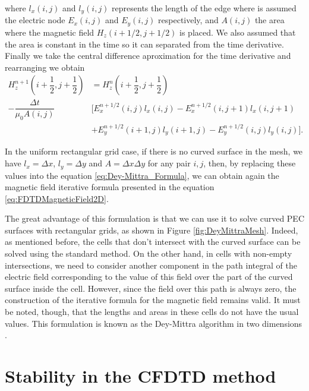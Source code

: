 \documentclass[12pt, oneside]{book}
\begin{document}
where $l_x(i,j)$ and $l_y(i,j)$ represents the length of the edge where is assumed the electric node $E_x(i,j)$ and $E_y(i,j)$ respectively, and $A(i,j)$ the area where the magnetic field $H_z (i + 1/2, j + 1/2)$ is placed. We also assumed that the area is constant in the time so it can separated from the time derivative. Finally we take the central difference aproximation for the time derivative and rearranging we obtain
\begin{equation}
    \begin{aligned}
        H_z^{n + 1}\left( i + \dfrac{1}{2}, j + \dfrac{1}{2} \right) &= H_z^{n}\left( i + \dfrac{1}{2}, j + \dfrac{1}{2} \right)  \\
        - \dfrac{\Delta t}{\mu_0 A(i,j)} & \big[ E^{n + 1/2}_x(i,j) l_x(i,j)- E^{n + 1/2}_x(i,j+1) l_x(i,j+1)  \\
                                                                       &+  E^{n + 1/2}_y(i+1,j) l_y(i+1,j) - E^{n + 1/2}_y(i,j) l_y(i,j)\big].  
    \end{aligned}
\label{eq:Dey-Mittra_Formula}
\end{equation}

In the uniform rectangular grid case, if there is no curved surface in the mesh, we have $l_x = \Delta x$, $l_y = \Delta y$ and $A = \Delta x \Delta y$ for any pair $i,j$, then, by replacing these values into the equation \ref{eq:Dey-Mittra_Formula}, we can obtain again the magnetic field iterative formula presented in the equation \ref{eq:FDTDMagneticField2D}.

The great advantage of this formulation is that we can use it to solve curved PEC surfaces with rectangular grids, as shown in Figure \ref{fig:DeyMittraMesh}. Indeed, as mentioned before, the cells that don't intersect with the curved surface can be solved using the standard method. On the other hand, in cells with non-empty intersections, we need to consider another component in the path integral of the electric field corresponding to the value of this field over the part of the curved surface inside the cell. However, since the field over this path is always zero, the construction of the iterative formula for the magnetic field remains valid. It must be noted, though, that the lengths and areas in these cells do not have the usual values. This formulation is known as the Dey-Mittra algorithm in two dimensions \cite{DeyMittra1997}.

\section{Stability in the CFDTD method}
\end{document}
